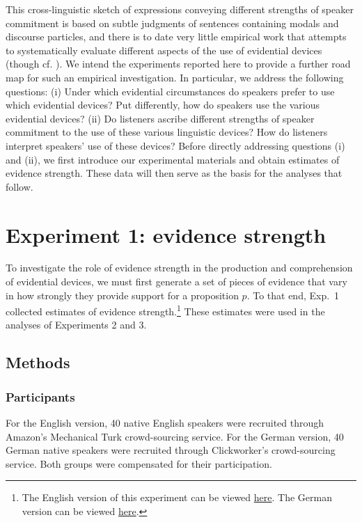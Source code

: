 \documentclass[11pt]{article}
\begin{document}
This cross-linguistic sketch of expressions conveying different strengths of speaker commitment is based on subtle judgments of sentences containing modals and discourse particles, and there is to date very little empirical work that attempts to systematically evaluate different aspects of the use of evidential devices (though cf. \cite{KnobeYalcin2014,LassiterInpress}). We intend the experiments reported here to provide a further road map for such an empirical investigation. In particular, we address the following questions: (i) Under which evidential circumstances do speakers prefer to use which evidential devices?  Put differently, how do speakers use the various evidential devices? (ii) Do listeners ascribe different strengths of speaker commitment to the use of these various linguistic devices? How do listeners interpret speakers' use of these devices? Before directly addressing questions (i) and (ii), we first introduce our experimental materials and obtain estimates of evidence strength. These data will then serve as the basis for the analyses that follow.

\section{Experiment 1: evidence strength}

To investigate the role of evidence strength in the production and comprehension of evidential devices, we must first generate a set of pieces of evidence that vary in how strongly they provide support for a proposition $p$. To that end, Exp.~1 collected estimates of evidence strength.\footnote{The English version of this experiment can be viewed \href{https://web.stanford.edu/~justinek/modals_exp/evidence.html}{here}. The German version can be viewed \href{http://web.stanford.edu/~jdegen/cgi-bin/4_dp_priors_evidencestrength/evidence.html}{here}.} These estimates were used in the analyses of Experiments 2 and 3.

\subsection{Methods}

\subsubsection{Participants}

For the English version, 40 native English speakers were recruited through Amazon's Mechanical Turk crowd-sourcing service. For the German version, 40 German native speakers were recruited through Clickworker's crowd-sourcing service. Both groups were compensated for their participation.
\end{document}
